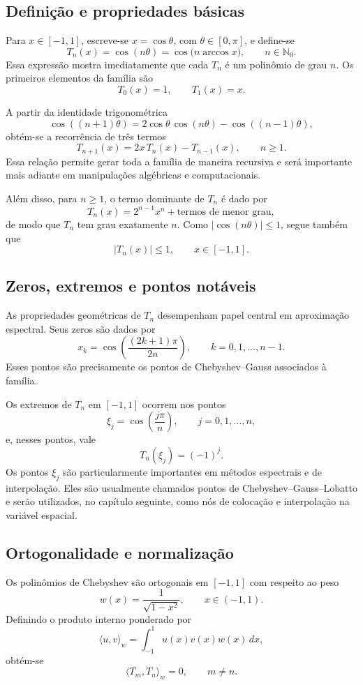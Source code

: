 \subsection{Definição e propriedades básicas}

Para \(x\in[-1,1]\), escreve-se \(x=\cos\theta\), com \(\theta\in[0,\pi]\), e define-se
\[
T_n(x)=\cos(n\theta)=\cos\bigl(n\arccos x\bigr), \qquad n\in\mathbb{N}_0.
\]
Essa expressão mostra imediatamente que cada \(T_n\) é um polinômio de grau \(n\). Os primeiros elementos da família são
\[
T_0(x)=1, \qquad T_1(x)=x.
\]

A partir da identidade trigonométrica
\[
\cos((n+1)\theta)=2\cos\theta\,\cos(n\theta)-\cos((n-1)\theta),
\]
obtém-se a recorrência de três termos
\[
T_{n+1}(x)=2x\,T_n(x)-T_{n-1}(x), \qquad n\geq 1.
\]
Essa relação permite gerar toda a família de maneira recursiva e será importante mais adiante em manipulações algébricas e computacionais.

Além disso, para \(n\geq 1\), o termo dominante de \(T_n\) é dado por
\[
T_n(x)=2^{n-1}x^n+\text{termos de menor grau},
\]
de modo que \(T_n\) tem grau exatamente \(n\). Como \(|\cos(n\theta)|\leq 1\), segue também que
\[
|T_n(x)|\leq 1, \qquad x\in[-1,1].
\]

\subsection{Zeros, extremos e pontos notáveis}

As propriedades geométricas de \(T_n\) desempenham papel central em aproximação espectral. Seus zeros são dados por
\[
x_k=\cos\left(\frac{(2k+1)\pi}{2n}\right), \qquad k=0,1,\dots,n-1.
\]
Esses pontos são precisamente os pontos de Chebyshev--Gauss associados à família.

Os extremos de \(T_n\) em \([-1,1]\) ocorrem nos pontos
\[
\xi_j=\cos\left(\frac{j\pi}{n}\right), \qquad j=0,1,\dots,n,
\]
e, nesses pontos, vale
\[
T_n(\xi_j)=(-1)^j.
\]
Os pontos \(\xi_j\) são particularmente importantes em métodos espectrais e de interpolação. Eles são usualmente chamados pontos de Chebyshev--Gauss--Lobatto e serão utilizados, no capítulo seguinte, como nós de colocação e interpolação na variável espacial.

\subsection{Ortogonalidade e normalização}

Os polinômios de Chebyshev são ortogonais em \([-1,1]\) com respeito ao peso
\[
w(x)=\frac{1}{\sqrt{1-x^2}}, \qquad x\in(-1,1).
\]
Definindo o produto interno ponderado por
\[
\langle u,v\rangle_w=\int_{-1}^{1}u(x)v(x)w(x)\,dx,
\]
obtém-se
\[
\langle T_m,T_n\rangle_w=0, \qquad m\neq n.
\]

